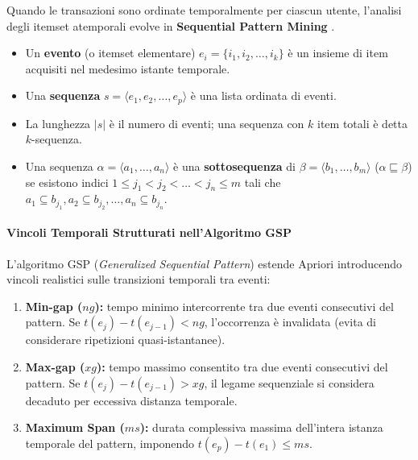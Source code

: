 Quando le transazioni sono ordinate temporalmente per ciascun utente, l'analisi degli itemset atemporali evolve in \textbf{Sequential Pattern Mining} \cite{agrawal1995}.
\begin{itemize}
    \item Un \textbf{evento} (o itemset elementare) $e_i = \{i_1, i_2, \dots, i_k\}$ è un insieme di item acquisiti nel medesimo istante temporale.
    \item Una \textbf{sequenza} $s = \langle e_1, e_2, \dots, e_p \rangle$ è una lista ordinata di eventi.
    \item La lunghezza $|s|$ è il numero di eventi; una sequenza con $k$ item totali è detta $k$-sequenza.
    \item Una sequenza $\alpha = \langle a_1, \dots, a_n \rangle$ è una \textbf{sottosequenza} di $\beta = \langle b_1, \dots, b_m \rangle$ ($\alpha \sqsubseteq \beta$) se esistono indici $1 \le j_1 < j_2 < \dots < j_n \le m$ tali che $a_1 \subseteq b_{j_1}, a_2 \subseteq b_{j_2}, \dots, a_n \subseteq b_{j_n}$.
\end{itemize}

\paragraph{Vincoli Temporali Strutturati nell'Algoritmo GSP}
L'algoritmo GSP (\textit{Generalized Sequential Pattern}) estende Apriori introducendo vincoli realistici sulle transizioni temporali tra eventi:
\begin{enumerate}
    \item \textbf{Min-gap ($ng$):} tempo minimo intercorrente tra due eventi consecutivi del pattern. Se $t(e_j) - t(e_{j-1}) < ng$, l'occorrenza è invalidata (evita di considerare ripetizioni quasi-istantanee).
    \item \textbf{Max-gap ($xg$):} tempo massimo consentito tra due eventi consecutivi del pattern. Se $t(e_j) - t(e_{j-1}) > xg$, il legame sequenziale si considera decaduto per eccessiva distanza temporale.
    \item \textbf{Maximum Span ($ms$):} durata complessiva massima dell'intera istanza temporale del pattern, imponendo $t(e_p) - t(e_1) \le ms$.
\end{enumerate}

